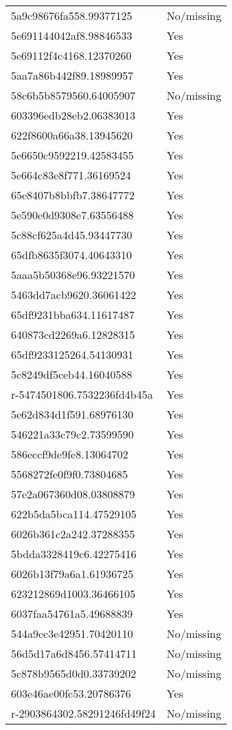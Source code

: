 \begin{tabular}{ll}
5a9c98676fa558.99377125 & No/missing \\
5e691144042af8.98846533 & Yes \\
5e69112f4c4168.12370260 & Yes \\
5aa7a86b442f89.18989957 & Yes \\
58c6b5b8579560.64005907 & No/missing \\
603396edb28eb2.06383013 & Yes \\
622f8600a66a38.13945620 & Yes \\
5e6650c9592219.42583455 & Yes \\
5e664c83e8f771.36169524 & Yes \\
65e8407b8bbfb7.38647772 & Yes \\
5e590e0d9308e7.63556488 & Yes \\
5c88cf625a4d45.93447730 & Yes \\
65dfb8635f3074.40643310 & Yes \\
5aaa5b50368e96.93221570 & Yes \\
5463dd7acb9620.36061422 & Yes \\
65df9231bba634.11617487 & Yes \\
640873cd2269a6.12828315 & Yes \\
65df9233125264.54130931 & Yes \\
5c8249df5ceb44.16040588 & Yes \\
r-5474501806.7532236fd4b45a & Yes \\
5e62d834d1f591.68976130 & Yes \\
546221a33c79c2.73599590 & Yes \\
586eccf9de9fe8.13064702 & Yes \\
5568272fe0f9f0.73804685 & Yes \\
57e2a067360d08.03808879 & Yes \\
622b5da5bca114.47529105 & Yes \\
6026b361c2a242.37288355 & Yes \\
5bdda3328419c6.42275416 & Yes \\
6026b13f79a6a1.61936725 & Yes \\
623212869d1003.36466105 & Yes \\
6037faa54761a5.49688839 & Yes \\
544a9cc3e42951.70420110 & No/missing \\
56d5d17a6d8456.57414711 & No/missing \\
5c878b9565d0d0.33739202 & No/missing \\
603e46ae00fc53.20786376 & Yes \\
r-2903864302.58291246fd49f24 & No/missing \\

\end{tabular}
